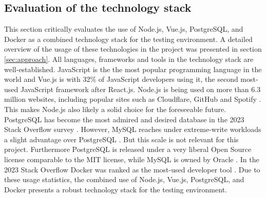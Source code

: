 \subsection{Evaluation of the technology stack}
This section critically evaluates the use of Node.js, Vue.js, PostgreSQL, and Docker as a combined technology stack for the testing environment. A detailed overview of the usage of these technologies in the project was presented in section \ref{sec:approach}. All languages, frameworks and tools in the technology stack are well-established. JavaScript is the the most popular programming language in the world \cite{jetbrains2023} and Vue.js is with 32\% of JavaScript developers using it, the second most-used JavaScript framework after React.js. Node.js is being used on more than 6.3 million websites, including popular sites such as Cloudflare, GitHub and Spotify \cite{Radixweb2023}. This makes Node.js also likely a solid choice for the foreseeable future. PostgreSQL has become the most admired and desired database in the 2023 Stack Overflow survey \cite{StackOverflow2023}. However, MySQL reaches under extreme-write workloads a slight advantage over PostgreSQL \cite{Bytebase2023}. But this scale is not relevant for this project. Furthermore PostgreSQL is released under a very liberal Open Source license comparable to the MIT license, while MySQL is owned by Oracle \cite{Bytebase2023}. In the 2023 Stack Overflow Docker was ranked as the most-used developer tool \cite{StackOverflow2023}. Due to these usage statistics, the combined use of Node.js, Vue.js, PostgreSQL, and Docker presents a robust technology stack for the testing environment. 